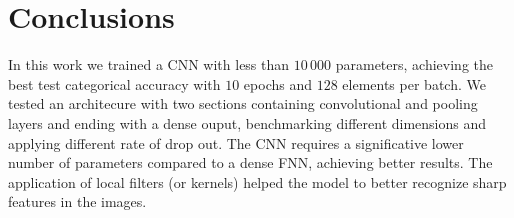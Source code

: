 \documentclass[compsoc]{IEEEtran}
\begin{document}
\section{Conclusions}
In this work we trained a CNN with less than $10\,000$ parameters, achieving the best test categorical accuracy with $10$ epochs and $128$ elements per batch. We tested an architecure with two sections containing convolutional and pooling layers and ending with a dense ouput, benchmarking different dimensions and applying different rate of drop out. The CNN requires a significative lower number of parameters compared to a dense FNN, achieving better results. The application of local filters (or kernels) helped the model to better recognize sharp features in the images.
\end{document}
